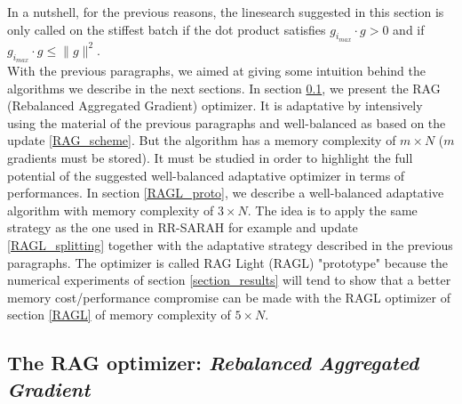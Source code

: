 In a nutshell, for the previous reasons, the linesearch suggested in this section is only called on the stiffest batch if the dot product satisfies $g_{i_{max}} \cdot g>0$ and if
$g_{i_{max}} \cdot g \leq \|g\|^2$. 
\ \\

%
%
%

With the previous paragraphs, we aimed at giving some intuition behind the algorithms we describe in the next sections. 
In section \ref{RAG}, we present the RAG (Rebalanced Aggregated Gradient) optimizer. It is adaptative by intensively using the material of the previous paragraphs and well-balanced
as based on the update \eqref{RAG_scheme}. But the
algorithm has a memory complexity of $m\times N$ ($m$ gradients must be stored). 
It must be studied in order to highlight the full potential of the suggested well-balanced adaptative optimizer in terms of performances. 
In section \ref{RAGL_proto}, we describe a well-balanced adaptative algorithm with memory complexity of $3\times N$. The idea is to apply the same strategy as the one used in
RR-SARAH for example and update \eqref{RAGL_splitting} together with the adaptative strategy described in the previous paragraphs. The optimizer is called RAG Light (RAGL) "prototype" because
the
numerical experiments of section \ref{section_results} will tend to show that a better memory cost/performance compromise can be made with the RAGL optimizer of section \ref{RAGL}
of memory complexity of $5\times N$. 


\subsection{The RAG optimizer: {\it Rebalanced Aggregated Gradient}}
\label{RAG}

